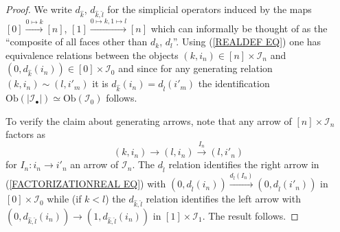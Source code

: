 \documentclass[a4paper,10pt]{article}%
\begin{document}
\begin{proof}
	We write $d_{\hat{k}}$, $d_{\hat{k},\hat{l}}$ for the simplicial operators induced by the maps 
	$[0]\xrightarrow{0 \mapsto k} [n]$,
	$[1]\xrightarrow{0 \mapsto k,1 \mapsto l} [n]$
	which can informally be thought of as the ``composite of all faces other than $d_k$, $d_l$''.
Using (\ref{REALDEF EQ}) one has equivalence relations
between the objects  
$(k,i_n) \in [n] \times \mathcal{I}_n$
and 
$(0,d_{\hat{k}}(i_n))
\in [0] \times \mathcal{I}_0$
and since for any generating relation $(k,i_n)\sim (l,i'_m)$
it is $d_{\hat{k}}(i_n) = d_{\hat{l}}(i'_m)$ the identification 
$\text{Ob}(|\mathcal{I}_{\bullet}|) \simeq \text{Ob}(\mathcal{I}_0)$
follows.


To verify the claim about generating arrows, note that any arrow of $[n]\times \mathcal{I}_n$ factors as 
\begin{equation}\label{FACTORIZATIONREAL EQ}
(k,i_n) \to (l,i_n)  \xrightarrow{I_n} (l,i'_n)
\end{equation}
for $I_n \colon i_n \to i'_n$
an arrow of $\mathcal{I}_n$. 
The $d_{\hat{l}}$ relation identifies the right arrow in 
(\ref{FACTORIZATIONREAL EQ})
with
$(0,d_{\hat{l}}(i_n))
	\xrightarrow{d_{\hat{l}}(I_n)}
(0,d_{\hat{l}}(i'_n))
$
in $[0]\times \mathcal{I}_0$
while (if $k<l$) the $d_{\hat{k},\hat{l}}$ relation identifies the left arrow with 
$(0,d_{\hat{k},\hat{l}}(i_n)) \to (1,d_{\hat{k},\hat{l}}(i_n))$
in $[1]\times \mathcal{I}_1$. The result follows.
\end{proof}
\end{document}
